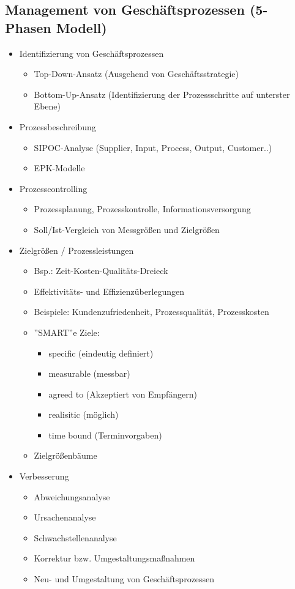 \documentclass[11pt,a4paper]{article}
\begin{document}
\subsection{Management von Geschäftsprozessen (5-Phasen Modell)}
\begin{itemize}
\item Identifizierung von Geschäftsprozessen
	\begin{itemize}
	\item Top-Down-Ansatz (Ausgehend von Geschäftsstrategie)
	\item Bottom-Up-Ansatz (Identifizierung der Prozessschritte auf unterster Ebene)
	\end{itemize}
	
\item Prozessbeschreibung
	\begin{itemize}
	\item SIPOC-Analyse (Supplier, Input, Process, Output, Customer..)
	\item EPK-Modelle
	\end{itemize}

\item Prozesscontrolling
	\begin{itemize}
	\item Prozessplanung, Prozesskontrolle, Informationsversorgung
	\item Soll/Ist-Vergleich von Messgrößen und Zielgrößen
	\end{itemize} 
	
\item Zielgrößen / Prozessleistungen
		\begin{itemize}
		\item Bsp.: Zeit-Kosten-Qualitäts-Dreieck
		\item Effektivitäts- und Effizienzüberlegungen
		\item Beispiele: Kundenzufriedenheit, Prozessqualität, Prozesskosten
		\item ''SMART''e Ziele:
			\begin{itemize}
			\item specific (eindeutig definiert)
			\item measurable (messbar)
			\item agreed to (Akzeptiert von Empfängern)
			\item realisitic (möglich)
			\item time bound (Terminvorgaben)
			\end{itemize}
		\item Zielgrößenbäume
		\end{itemize}

\item Verbesserung
	\begin{itemize}
	\item Abweichungsanalyse
	\item Ursachenanalyse
	\item Schwachstellenanalyse
	\item Korrektur bzw. Umgestaltungsmaßnahmen
	\item Neu- und Umgestaltung von Geschäftsprozessen
	\end{itemize}		

\end{itemize}
\end{document}
